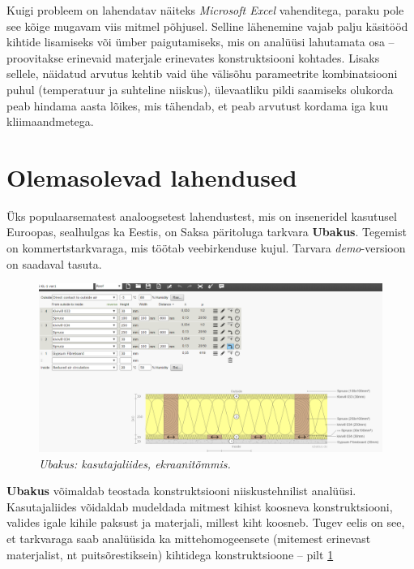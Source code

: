 Kuigi probleem on lahendatav näiteks \textit{Microsoft Excel} vahenditega, paraku pole see kõige mugavam viis
mitmel põhjusel. Selline lähenemine vajab palju käsitööd kihtide lisamiseks või ümber paigutamiseks, mis on analüüsi lahutamata
osa -- proovitakse erinevaid materjale erinevates konstruktsiooni kohtades. Lisaks sellele, näidatud arvutus kehtib vaid ühe 
välisõhu parameetrite kombinatsiooni puhul (temperatuur ja suhteline niiskus), ülevaatliku pildi saamiseks olukorda peab hindama
 aasta lõikes, mis tähendab, et  peab arvutust kordama iga kuu kliimaandmetega.

\section{Olemasolevad lahendused}
\label{chapters:problem_statement_existing_solutions}
Üks populaarsematest analoogsetest lahendustest, mis on inseneridel kasutusel Euroopas, sealhulgas ka Eestis, on Saksa päritoluga tarkvara \textbf{Ubakus}. 
Tegemist on kommertstarkvaraga, mis töötab veebirkenduse kujul. Tarvara \textit{demo}-versioon on saadaval tasuta.
\begin{figure}[ht]
    \centering
    \includegraphics[width=.8\textwidth]{figures/problem_statement/01_ubakus.png}
    \caption[Ubakus tarkvara katutajaliides, ekraanitõmmis]{\textit{Ubakus: kasutajaliides, ekraanitõmmis.}}
    \label{fig:ubakus_sample}
\end{figure}

\textbf{Ubakus} võimaldab teostada konstruktsiooni niiskustehnilist analüüsi. Kasutajaliides võidaldab 
mudeldada mitmest kihist koosneva konstruktsiooni, valides igale kihile paksust ja materjali, millest 
kiht koosneb. Tugev eelis on see, et tarkvaraga saab analüüsida ka mittehomogeensete (mitemest erinevast 
materjalist, nt puitsõrestiksein) kihtidega konstruktsioone -- pilt \ref{fig:ubakus_sample}

